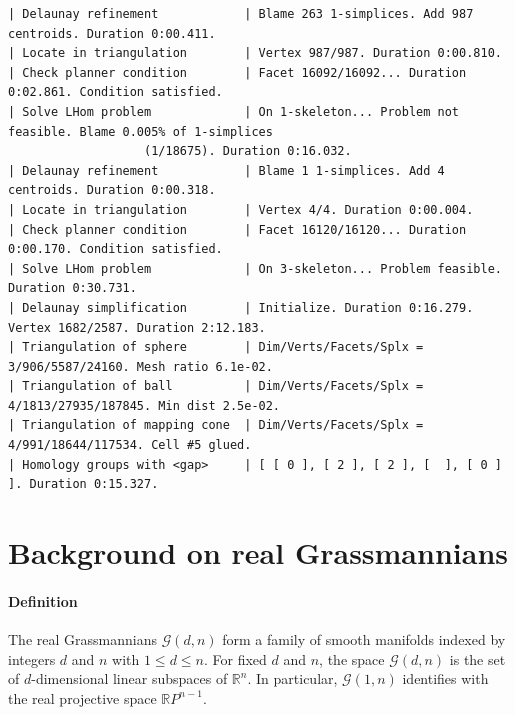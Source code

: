 \documentclass[a4paper,english,cleveref,autoref,thm-restate,nolineno]{socg-lipics-v2021}
\newcommand{\R}{\mathbb R}
\newcommand{\GG}{\mathcal G} %
\begin{document}
\begin{lstlisting}[style=consolestyle,caption={Console output of \Cref{alg:algorithm_full} on the Grassmannian $\GG(2,4)$},label={lst:execution}]
| Delaunay refinement            | Blame 263 1-simplices. Add 987 centroids. Duration 0:00.411.
| Locate in triangulation        | Vertex 987/987. Duration 0:00.810. 
| Check planner condition        | Facet 16092/16092... Duration 0:02.861. Condition satisfied.
| Solve LHom problem             | On 1-skeleton... Problem not feasible. Blame 0.005% of 1-simplices 
				   (1/18675). Duration 0:16.032.
| Delaunay refinement            | Blame 1 1-simplices. Add 4 centroids. Duration 0:00.318.
| Locate in triangulation        | Vertex 4/4. Duration 0:00.004.
| Check planner condition        | Facet 16120/16120... Duration 0:00.170. Condition satisfied.
| Solve LHom problem             | On 3-skeleton... Problem feasible. Duration 0:30.731.
| Delaunay simplification        | Initialize. Duration 0:16.279. Vertex 1682/2587. Duration 2:12.183.
| Triangulation of sphere        | Dim/Verts/Facets/Splx = 3/906/5587/24160. Mesh ratio 6.1e-02.
| Triangulation of ball          | Dim/Verts/Facets/Splx = 4/1813/27935/187845. Min dist 2.5e-02.
| Triangulation of mapping cone  | Dim/Verts/Facets/Splx = 4/991/18644/117534. Cell #5 glued.
| Homology groups with <gap>     | [ [ 0 ], [ 2 ], [ 2 ], [  ], [ 0 ] ]. Duration 0:15.327.
\end{lstlisting}

\section{Background on real Grassmannians}
\label{sec:background_grassmannian}

\paragraph*{Definition}

The real Grassmannians $\GG(d,n)$ form a family of smooth manifolds indexed by integers
$d$ and $n$ with $1 \le d \le n$.
For fixed $d$ and $n$, the space $\GG(d,n)$ is the set of $d$-dimensional linear subspaces of $\R^n$.
In particular, $\GG(1,n)$ identifies with the real projective space $\R P^{n-1}$.
\end{document}
